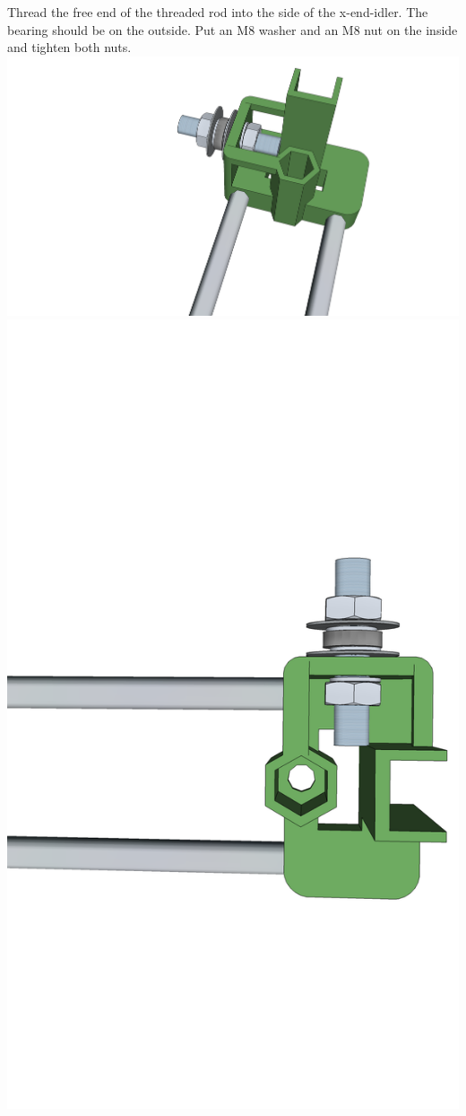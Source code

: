\documentclass[twoside,a4paper,titlepage]{memoir}
\begin{document}
	\section{}
	Thread the free end of the threaded rod into the side of the x-end-idler. The bearing should be on the
	outside. Put an M8 washer and an M8 nut on the inside and tighten both nuts.\\
	\includegraphics[width=1\linewidth]{graphics/ch7_11_1.png}
	\includegraphics[width=1\linewidth]{graphics/ch7_11_2.png}
	
\end{document}
